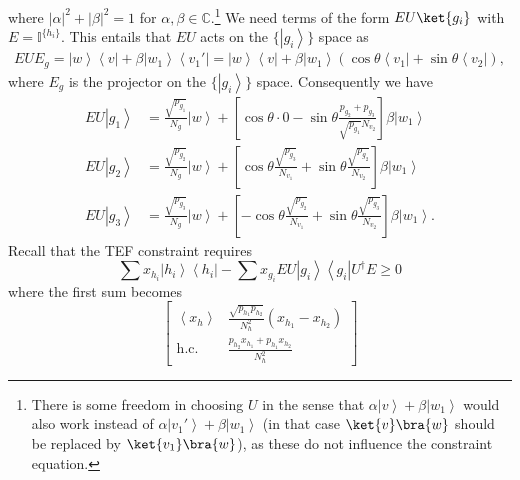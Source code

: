 \documentclass{article}
\begin{document}
where $\left|\alpha\right|^{2}+\left|\beta\right|^{2}=1$ for $\alpha,\beta\in\mathbb{C}$.\footnote{There is some freedom in choosing $U$ in the sense that $\alpha\left|v\right\rangle +\beta\left|w_{1}\right\rangle $ would also work instead of $\alpha\left|v_1'\right\rangle +\beta\left|w_{1}\right\rangle$ (in that case $\ket{v}\bra{w}$ should be replaced by $\ket{v_1}\bra{w}$), as these do not influence the constraint equation.} %
We need terms of the form $EU\ket{g_i}$ with $E=\mathbb{I}^{\{h_i\}}$. This entails that $EU$ acts on the $\{\left|g_{i}\right\rangle \}$
space as
\begin{align*}
  EUE_{g}  =\left|w\right\rangle \left\langle v\right|+\beta\left|w_{1}\right\rangle \left\langle v_{1}'\right| =\left|w\right\rangle \left\langle v\right|+\beta\left|w_{1}\right\rangle \left(\cos\theta\left\langle v_{1}\right|+\sin\theta\left\langle v_{2}\right|\right),
\end{align*}
where $E_g$ is the projector on the $\{\left|g_{i}\right\rangle \}$ space.
Consequently we have
\begin{align*}
  EU\left|g_{1}\right\rangle & =\frac{\sqrt{p_{g_{1}}}}{N_{g}}\left|w\right\rangle +\left[\cos\theta\cdot 0-\sin\theta\frac{p_{g_{2}}+p_{g_{3}}}{\sqrt{p_{g_{1}}}N_{v_{2}}}\right]\beta\left|w_{1}\right\rangle            \\
  EU\left|g_{2}\right\rangle & =\frac{\sqrt{p_{g_{2}}}}{N_{g}}\left|w\right\rangle +\left[\cos\theta\frac{\sqrt{p_{g_{3}}}}{N_{v_{1}}}+\sin\theta\frac{\sqrt{p_{g_{2}}}}{N_{v_{2}}}\right]\beta\left|w_{1}\right\rangle    \\
  EU\left|g_{3}\right\rangle & =\frac{\sqrt{p_{g_{3}}}}{N_{g}}\left|w\right\rangle +\left[-\cos\theta\frac{\sqrt{p_{g_{2}}}}{N_{v_{1}}}+\sin\theta\frac{\sqrt{p_{g_{3}}}}{N_{v_{2}}}\right]\beta\left|w_{1}\right\rangle .
\end{align*}
Recall that the TEF constraint requires
\begin{displaymath}
  \sum x_{h_{i}}\left|h_{i}\right\rangle \left\langle h_{i}\right|-\sum x_{g_{i}}EU\left|g_{i}\right\rangle \left\langle g_{i}\right|U^{\dagger}E\ge0
\end{displaymath}
where the first sum becomes
\begin{displaymath}
  \left[\begin{array}{cc}
      \left\langle x_{h}\right\rangle & \frac{\sqrt{p_{h_{1}}p_{h_{2}}}}{N_{h}^{2}}(x_{h_{1}}-x_{h_{2}}) \\
      \text{h.c.}                     & \frac{p_{h_{2}}x_{h_{1}}+p_{h_{1}}x_{h_{2}}}{N_{h}^{2}}
    \end{array}\right]
\end{displaymath}
\end{document}
